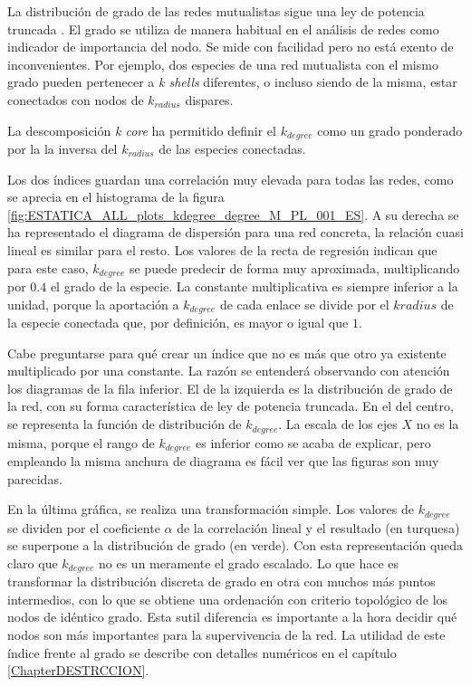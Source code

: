 La distribución de grado de las redes mutualistas sigue una ley de potencia truncada \cite{jordano2003invariant,vazquez2005degree}. El grado se utiliza de manera habitual en el análisis de redes como indicador de importancia del nodo. Se mide con facilidad pero no está exento de inconvenientes. Por ejemplo, dos especies de una red mutualista con el mismo grado pueden pertenecer a \textit{k shells} diferentes, o incluso siendo de la misma, estar conectados con nodos de $k_{radius}$ dispares.

La descomposición \textit{k core} ha permitido definir el $k_{degree}$ como un grado ponderado por la la inversa del $k_{radius}$ de las especies conectadas. 

Los dos índices guardan una correlación muy elevada para todas las redes, como se aprecia en el histograma de la figura \ref{fig:ESTATICA_ALL_plots_kdegree_degree_M_PL_001_ES}. A su derecha se ha representado el diagrama de dispersión para una red concreta, la relación cuasi lineal es similar para el resto. Los valores de la recta de regresión indican que para este caso, $k_{degree}$ se puede predecir de forma muy aproximada, multiplicando por $0.4$ el grado de la especie. La constante multiplicativa es siempre inferior a la unidad, porque la aportación a $k_{degree}$ de cada enlace se divide por el $k{radius}$ de la especie conectada que, por definición, es mayor o igual que $1$. 

Cabe preguntarse para qué crear un índice que no es más que otro ya existente multiplicado por una constante. La razón se entenderá observando con atención los diagramas de la fila inferior. El de la izquierda es la distribución de grado de la red, con su forma característica de ley de potencia truncada. En el del centro, se representa la función de distribución de $k_{degree}$. La escala de los ejes $X$ no es la misma, porque el rango de $k_{degree}$ es inferior como se acaba de explicar, pero empleando la misma anchura de diagrama es fácil ver que las figuras son muy parecidas.

En la última gráfica, se realiza una transformación simple. Los valores de $k_{degree}$ se dividen por el coeficiente $\alpha$ de la correlación lineal y el resultado (en turquesa) se superpone a la distribución de grado (en verde). Con esta representación queda claro que $k_{degree}$ no es un meramente el grado escalado. Lo que hace es transformar la distribución discreta de grado en otra con muchos más puntos intermedios, con lo que se obtiene una ordenación con criterio topológico de los nodos de idéntico grado. Esta sutil diferencia es importante a la hora decidir qué nodos son más importantes para la supervivencia de la red. La utilidad de este índice frente al grado se describe con detalles numéricos en el capítulo \ref{ChapterDESTRCCION}.

